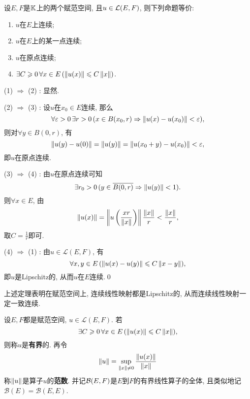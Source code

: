     \begin{Theorem}[连续性]\label{thm:线性算子连续性}
    设$ E, F $是$ \mathbb{K} $上的两个赋范空间, 且$ u\in\mathcal{L}(E,F) $, 则下列命题等价:
    \begin{enumerate}[(1)]
    \item $ u $在$ E $上连续;
    \item $ u $在$ E $上的某一点连续;
    \item $ u $在原点连续;
    \item $ \exists C\geqslant 0\,\forall x\in E\,(\left\| u(x) \right\|\leqslant C\left\| x \right\|) $.
    \end{enumerate}
    \end{Theorem}
    \begin{Proof}
        (1) $ \Rightarrow $ (2) : 显然.

        (2) $ \Rightarrow $ (3) : 设$ u $在$ x_0\in E $连续, 那么
        \[
            \forall\varepsilon>0\,\exists r>0\,(x\in B(x_0,r)\Rightarrow\left\| u(x)-u(x_0) \right\|<\varepsilon),
        \]
        则对$ \forall y\in B(0,r) $, 有
        \[
            \left\| u(y)-u(0) \right\|=\left\| u(y) \right\|=\left\| u(x_0+y)-u(x_0) \right\|<\varepsilon,
        \]
        即$ u $在原点连续.

        (3) $ \Rightarrow $ (4) : 由$ u $在原点连续可知
        \[
            \exists r_0>0\,(y\in\overline{B(0,r)}\Rightarrow\left\| u(y) \right\|<1).
        \]
        则$ \forall x\in E $, 由
        \[
            \left\| u(x) \right\|=\left\| u\left(\dfrac{xr}{\left\| x \right\|}\right) \right\|\frac{\left\| x \right\|}{r}<\frac{\left\| x \right\|}{r},
        \]
        取$ C=\frac{1}{r} $即可.

        (4) $ \Rightarrow $ (1) : 由$ u\in\mathcal{L}(E,F) $, 有
        \[
            \forall x,y\in E\,(\left\| u(x)-u(y) \right\|\leqslant C\left\| x-y \right\|),
        \]
        即$ u $是Lipschitz的, 从而$ u $在$ E $连续.\qed
    \end{Proof}

    \begin{Remark}
        上述定理表明在赋范空间上, 连续线性映射都是Lipschitz的, 从而连续线性映射一定一致连续.
    \end{Remark}

    \begin{Definition}[算子范数]
        设$ E,F $都是赋范空间, $ u\in\mathcal{L}(E,F) $. 若
        \[
            \exists C\geqslant 0\,\forall x\in E\,(\left\| u(x) \right\|\leqslant C\left\| x \right\|),
        \]
        则称$ u $是\textbf{有界}的. 再令
        \[
            \left\| u \right\|=\sup_{\left\| x \right\|\ne 0}\frac{\left\| u(x) \right\|}{\left\| x \right\|}
        \]
        称$ \left\| u \right\| $是算子$ u $的\textbf{范数}. 并记$ \mathcal{B}(E,F) $是$ E $到$ F $的有界线性算子的全体, 且类似地记$ \mathcal{B}(E)=\mathcal{B}(E,E) $.
    \end{Definition}

